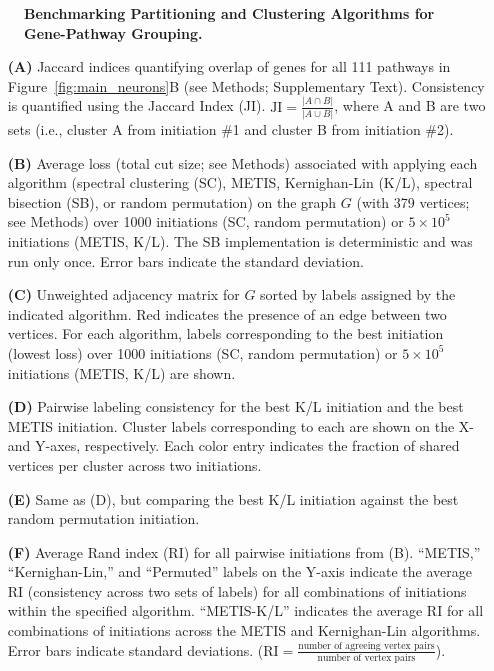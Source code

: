 \begin{figure}[H]
\begin{subfigure}[t]{0.33\textwidth}
    \end{subfigure}
    \caption{
        \textbf{Benchmarking Partitioning and Clustering Algorithms for Gene-Pathway Grouping.}\\
    }
    \label{fig:benchmarking_clustering}
\end{figure}
\begin{itemize}
    \item[\textbf{(A)}] Jaccard indices quantifying overlap of genes for all 111 pathways in Figure~\ref{fig:main_neurons}B (see Methods; Supplementary Text). Consistency is quantified using the Jaccard Index (JI). $\text{JI} = \frac{|A \cap B|}{|A \cup B|}$, where A and B are two sets (i.e., cluster A from initiation \#1 and cluster B from initiation \#2).
    \item[\textbf{(B)}] Average loss (total cut size; see Methods) associated with applying each algorithm (spectral clustering (SC), METIS, Kernighan-Lin (K/L), spectral bisection (SB), or random permutation) on the graph $G$ (with 379 vertices; see Methods) over 1000 initiations (SC, random permutation) or $5 \times 10^5$ initiations (METIS, K/L). The SB implementation is deterministic and was run only once. Error bars indicate the standard deviation. 
    \item[\textbf{(C)}] Unweighted adjacency matrix for $G$ sorted by labels assigned by the indicated algorithm. Red indicates the presence of an edge between two vertices. For each algorithm, labels corresponding to the best initiation (lowest loss) over 1000 initiations (SC, random permutation) or $5 \times 10^5$ initiations (METIS, K/L) are shown. 
    \item[\textbf{(D)}] Pairwise labeling consistency for the best K/L initiation and the best METIS initiation. Cluster labels corresponding to each are shown on the X- and Y-axes, respectively. Each color entry indicates the fraction of shared vertices per cluster across two initiations. 
    \item[\textbf{(E)}] Same as (D), but comparing the best K/L initiation against the best random permutation initiation. 
    \item[\textbf{(F)}] Average Rand index (RI) for all pairwise initiations from (B). “METIS,” “Kernighan-Lin,” and “Permuted” labels on the Y-axis indicate the average RI (consistency across two sets of labels) for all combinations of initiations within the specified algorithm. “METIS-K/L” indicates the average RI for all combinations of initiations across the METIS and Kernighan-Lin algorithms. Error bars indicate standard deviations. ($\text{RI} = \frac{\text{number of agreeing vertex pairs}}{\text{number of vertex pairs}}$).
\end{itemize}